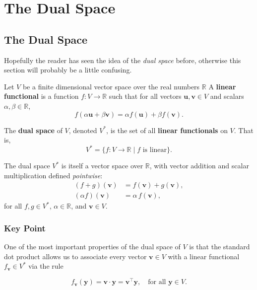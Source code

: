 \chapter{The Dual Space}

\Large

\section{\huge The Dual Space}

Hopefully the reader has seen the idea of the \emph{dual space} before, otherwise this section will probably be a little confusing. 

Let $ V $ be a finite dimensional vector space over the real numbers $ \mathbb{R} $  
A \textbf{linear functional} is a function $ f: V \to \mathbb{R} $ such that for all vectors $ \mathbf{u}, \mathbf{v} \in V $ and scalars $ \alpha, \beta \in \mathbb{R} $,
\[
f(\alpha \mathbf{u} + \beta \mathbf{v}) = \alpha f(\mathbf{u}) + \beta f(\mathbf{v}).
\]



The \textbf{dual space} of $ V $, denoted $ V^* $, is the set of all \textbf{linear functionals} on $ V $. That is,
\[
V^* = \{ f: V \to \mathbb{R} \mid f \text{ is linear} \}.
\]



The dual space $ V^* $ is itself a vector space over $ \mathbb{R} $, with vector addition and scalar multiplication defined \textit{pointwise}:
\begin{align*}
(f + g)(\mathbf{v}) &= f(\mathbf{v}) + g(\mathbf{v}), \\
(\alpha f)(\mathbf{v}) &= \alpha \, f(\mathbf{v}),
\end{align*}
for all $ f, g \in V^* $, $ \alpha \in \mathbb{R} $, and $ \mathbf{v} \in V $.



\subsection*{\Large Key Point}

One of the most important properties of the dual space of $V$ is that the standard dot product allows us to associate every vector $\mathbf{v} \in V$ with a linear functional $f_{\mathbf{v}} \in V^*$ via the rule

\vspace{1em}
\[
\boxed{f_{\mathbf{v}}(\mathbf{y}) = \mathbf{v} \cdot \mathbf{y} = \mathbf{v}^\top \mathbf{y}, 
\quad \text{for all } \mathbf{y} \in V}.
\]
\vspace{1em}

